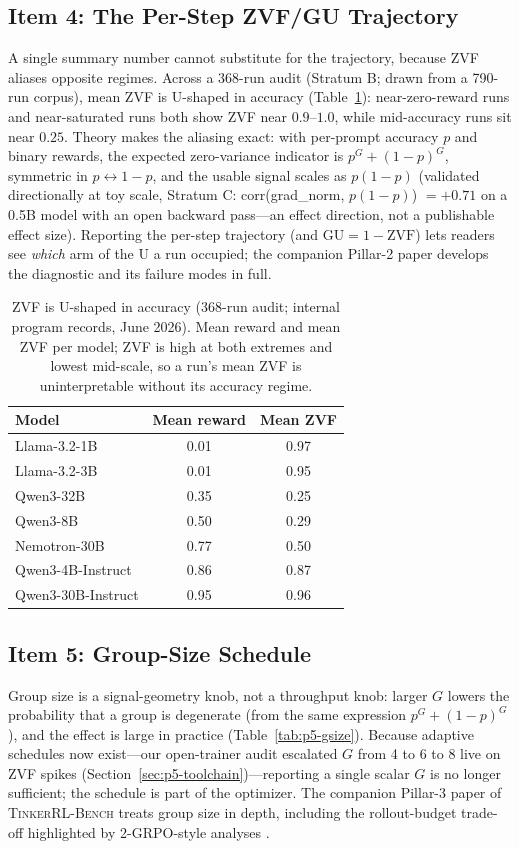 \documentclass{article}  \usepackage[preprint,nonatbib]{neurips_2026} \usepackage[numbers]{natbib}
\newcommand{\ours}{\textsc{TinkerRL-Bench}}
\providecommand{\tableref}[1]{Table~\ref{#1}}
\providecommand{\secref}[1]{Section~\ref{#1}}
\begin{document}
\subsection{Item 4: The Per-Step ZVF/GU Trajectory}
\label{sec:p5-item4}
A single summary number cannot substitute for the trajectory, because ZVF
aliases opposite regimes. Across a 368-run audit (Stratum B; drawn from a
790-run corpus), mean ZVF is U-shaped in accuracy (\tableref{tab:p5-ushape}):
near-zero-reward runs and near-saturated runs both show ZVF near $0.9$--$1.0$,
while mid-accuracy runs sit near $0.25$. Theory makes the aliasing exact: with
per-prompt accuracy $p$ and binary rewards, the expected zero-variance
indicator is $p^G + (1-p)^G$, symmetric in $p \leftrightarrow 1-p$, and the
usable signal scales as $p(1-p)$ (validated directionally at toy scale,
Stratum C: corr(grad\_norm, $p(1-p)$) $= +0.71$ on a 0.5B model with an open
backward pass---an effect direction, not a publishable effect size). Reporting
the per-step trajectory (and $\mathrm{GU} = 1 - \mathrm{ZVF}$) lets readers
see \emph{which} arm of the U a run occupied; the companion Pillar-2 paper
develops the diagnostic and its failure modes in full.

\begin{table}[t]
\centering
\caption{ZVF is U-shaped in accuracy (368-run audit; internal program
records, June 2026). Mean reward and mean ZVF per model; ZVF is high at both
extremes and lowest mid-scale, so a run's mean ZVF is uninterpretable without
its accuracy regime.}
\label{tab:p5-ushape}
\small
\begin{tabular}{@{}lcc@{}}
\toprule
Model & Mean reward & Mean ZVF \\
\midrule
Llama-3.2-1B        & 0.01 & 0.97 \\
Llama-3.2-3B        & 0.01 & 0.95 \\
Qwen3-32B           & 0.35 & 0.25 \\
Qwen3-8B            & 0.50 & 0.29 \\
Nemotron-30B        & 0.77 & 0.50 \\
Qwen3-4B-Instruct   & 0.86 & 0.87 \\
Qwen3-30B-Instruct  & 0.95 & 0.96 \\
\bottomrule
\end{tabular}
\end{table}

\subsection{Item 5: Group-Size Schedule}
\label{sec:p5-item5}
Group size is a signal-geometry knob, not a throughput knob: larger $G$ lowers
the probability that a group is degenerate (from the same expression
$p^G + (1-p)^G$), and the effect is large in practice
(\tableref{tab:p5-gsize}). Because adaptive schedules now exist---our
open-trainer audit escalated $G$ from 4 to 6 to 8 live on ZVF spikes
(\secref{sec:p5-toolchain})---reporting a single scalar $G$ is no longer
sufficient; the schedule is part of the optimizer. The companion Pillar-3
paper of \ours{} treats group size in depth, including the rollout-budget
trade-off highlighted by 2-GRPO-style analyses \citep{wu2025grpo_dpo,
tan2025scalingrl}.
\end{document}
